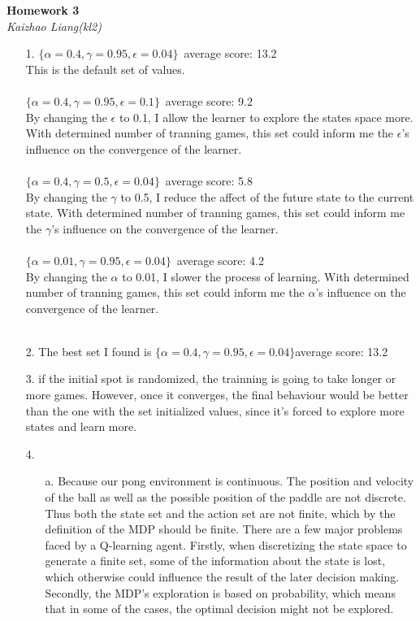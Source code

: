 \documentclass{article}
\begin{document}
\begin{titlepage}
   \begin{center}
      \Large\textbf{Homework 3}\\
      \large\textit{Kaizhao Liang(kl2)}
   \end{center}
   \begin{enumerate}
   	\item[1.]
   		\(\{\alpha=0.4,\gamma=0.95, \epsilon=0.04\}\)\ average score: 13.2 \\
   		This is the default set of values.\\\\
   		\(\{\alpha=0.4,\gamma=0.95, \epsilon=0.1\}\)\ average score: 9.2 \\
   		By changing the \(\epsilon\) to 0.1, I allow the learner to explore the states space more. With determined number of tranning games, this set could inform me the \(\epsilon\)'s influence on the convergence of the learner.\\\\
   		\(\{\alpha=0.4,\gamma=0.5, \epsilon=0.04\}\)\ average score: 5.8 \\
   		By changing the \(\gamma\) to 0.5, I reduce the affect of the future state to the current state. With determined number of tranning games, this set could inform me the \(\gamma\)'s influence on the convergence of the learner.\\\\
		\(\{\alpha=0.01,\gamma=0.95, \epsilon=0.04\}\)\ average score: 4.2 \\
		By changing the \(\alpha\) to 0.01, I slower the process of learning. With determined number of tranning games, this set could inform me the \(\alpha\)'s influence on the convergence of the learner.\\\\
   	\item[2.]
   		The best set I found is	\(\{\alpha=0.4,\gamma=0.95, \epsilon=0.04\}\)average score: 13.2 \\
   	\item[3.]
   		if the initial spot is randomized, the trainning is going to take longer or more games. However, once it converges, the final behaviour would be better than the one with the set initialized values, since it's forced to explore more states and learn more.
   	\item[4.]
   		\begin{enumerate}
   			\item[a.] Because our pong environment is continuous. The position and velocity of the ball as well as the possible position of the paddle are not discrete. Thus both the state set and the action set are not finite, which by the definition of the MDP should be finite. There are a few major problems faced by a Q-learning agent. Firstly, when discretizing the state space to generate a finite set, some of the information about the state is lost, which otherwise could influence the result of the later decision making. Secondly, the MDP's exploration is based on probability, which means that in some of the cases, the optimal decision might not be explored.

\end{enumerate}
\end{enumerate}
\end{titlepage}
\end{document}
